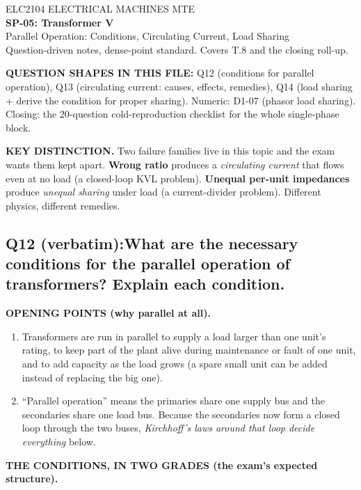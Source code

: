 \documentclass[11pt]{article}
\newcommand{\qhead}[2]{\subsection*{\color{copper}#1\quad\color{iron}#2}}
\newcommand{\tagline}[1]{\textbf{\color{copper}#1}}
\newcommand{\keydist}[1]{\vspace{2pt}\textbf{\color{red}KEY DISTINCTION.} #1}
\begin{document}
\begin{center}
{\footnotesize\color{copper} ELC2104 \textbar{} ELECTRICAL MACHINES \textbar{} MTE}\\[6pt]
{\LARGE\bfseries\color{iron} SP-05: Transformer V}\\[2pt]
{\Large\color{copper} Parallel Operation: Conditions, Circulating Current, Load Sharing}\\[6pt]
{\footnotesize\color{muted} Question-driven notes, dense-point standard. Covers T.8 and the closing roll-up.}
\end{center}

\vspace{2pt}
\tagline{QUESTION SHAPES IN THIS FILE:} Q12 (conditions for parallel operation), Q13 (circulating current: causes, effects, remedies), Q14 (load sharing + derive the condition for proper sharing). Numeric: D1-07 (phasor load sharing). Closing: the 20-question cold-reproduction checklist for the whole single-phase block.
\vspace{2pt}

\keydist{Two failure families live in this topic and the exam wants them kept apart. \textbf{Wrong ratio} produces a \emph{circulating current} that flows even at no load (a closed-loop KVL problem). \textbf{Unequal per-unit impedances} produce \emph{unequal sharing} under load (a current-divider problem). Different physics, different remedies.}

\hrulefill

\qhead{Q12 (verbatim):}{What are the necessary conditions for the parallel operation of transformers? Explain each condition.}

\tagline{OPENING POINTS (why parallel at all).}
\begin{enumerate}[label=\arabic*.]
\item Transformers are run in parallel to supply a load larger than one unit's rating, to keep part of the plant alive during maintenance or fault of one unit, and to add capacity as the load grows (a spare small unit can be added instead of replacing the big one).
\item ``Parallel operation'' means the primaries share one supply bus and the secondaries share one load bus. Because the secondaries now form a closed loop through the two buses, \emph{Kirchhoff's laws around that loop decide everything} below.
\end{enumerate}

\tagline{THE CONDITIONS, IN TWO GRADES (the exam's expected structure).}
\end{document}
